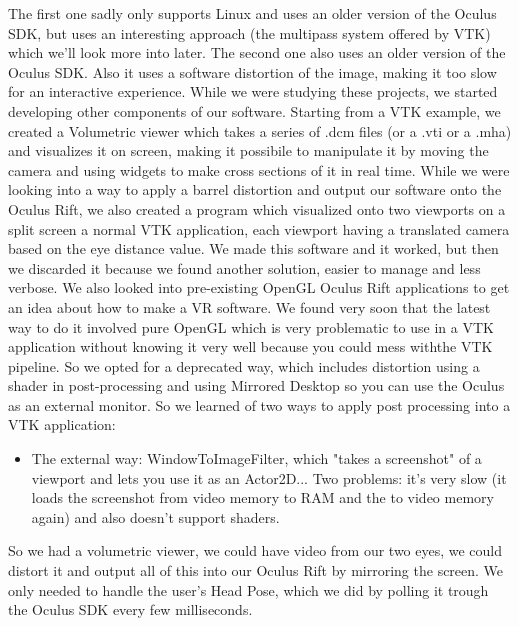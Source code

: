 \documentclass[11pt]{article} %
\begin{document}
The first one sadly only supports Linux and uses an older version of  the Oculus SDK, but uses an interesting approach (the multipass system offered by VTK) which we'll look more into later.
The second one also uses an older version of the Oculus SDK. Also it uses a software distortion of the image, making it too slow for an interactive experience.
While we were studying these projects, we started developing other components of our software.
Starting from a VTK example, we created a Volumetric viewer which takes a series of .dcm files (or a .vti or a .mha) and visualizes it on screen, making it possibile to manipulate it by moving the camera and using widgets to make cross sections of it in real time.
While we were looking into a way to apply a barrel distortion and output our software onto the Oculus Rift, we also created a program which visualized onto two viewports on a split screen a normal VTK application, each viewport having a translated camera based on the eye distance value. We made this software and it worked, but then we discarded it because we found another solution, easier to manage and less verbose.
We also looked into pre-existing OpenGL Oculus Rift applications to get an idea about how to make a VR software. We found very soon that the latest way to do it involved pure OpenGL which is very problematic to use in a VTK application without knowing it very well because you could mess withthe VTK pipeline. So we opted for a deprecated way, which includes distortion using a shader in post-processing and using Mirrored Desktop so you can use the Oculus as an external monitor.
So we learned of two ways to apply post processing into a VTK application:
\begin{itemize}
\item The external way: WindowToImageFilter, which "takes a screenshot" of a viewport and lets you use it as an Actor2D... Two problems: it's very slow (it loads the screenshot from video memory to RAM and the to video memory again) and also doesn't support shaders.
\end{itemize}
So we had a volumetric viewer, we could have video from our two eyes, we could distort it and output all of this into our Oculus Rift by mirroring the screen.
We only needed to handle the user's Head Pose, which we did by polling it trough the Oculus SDK every few milliseconds.
\end{document}
